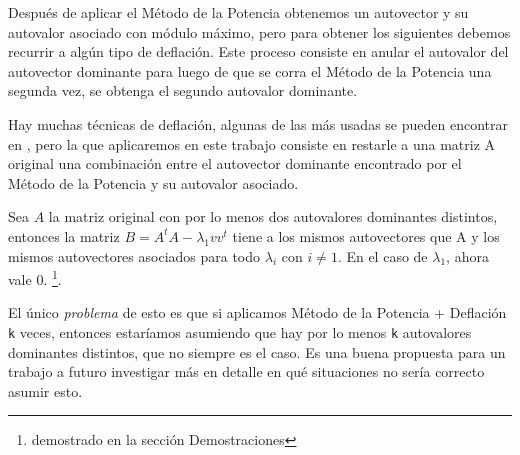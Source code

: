Después de aplicar el Método de la Potencia obtenemos un autovector y su autovalor asociado con
módulo máximo, pero para obtener los siguientes debemos recurrir a algún tipo de deflación. Este
proceso consiste en anular el autovalor del autovector dominante para luego de que se corra el
Método de la Potencia una segunda vez, se obtenga el segundo autovalor dominante.

Hay muchas técnicas de deflación, algunas de las más usadas se pueden encontrar en \cite{burden},
pero la que aplicaremos en este trabajo consiste en restarle a una matriz A original una combinación
entre el autovector dominante encontrado por el Método de la Potencia y su autovalor asociado.

Sea $A$ la matriz original con por lo menos dos autovalores dominantes distintos, entonces la matriz
$B = A^t A - \lambda_{1} v v^t$ tiene a los mismos autovectores que A y los mismos autovectores
asociados para todo $\lambda_i$ con $i \neq 1$. En el caso de $\lambda_1$, ahora vale 0.
\footnote{demostrado en la sección Demostraciones}.

El único \textit{problema} de esto es que si aplicamos Método de la Potencia + Deflación \texttt{k}
veces, entonces estaríamos asumiendo que hay por lo menos \texttt{k} autovalores dominantes
distintos, que no siempre es el caso. Es una buena propuesta para un trabajo a futuro investigar más
en detalle en qué situaciones no sería correcto asumir esto.
